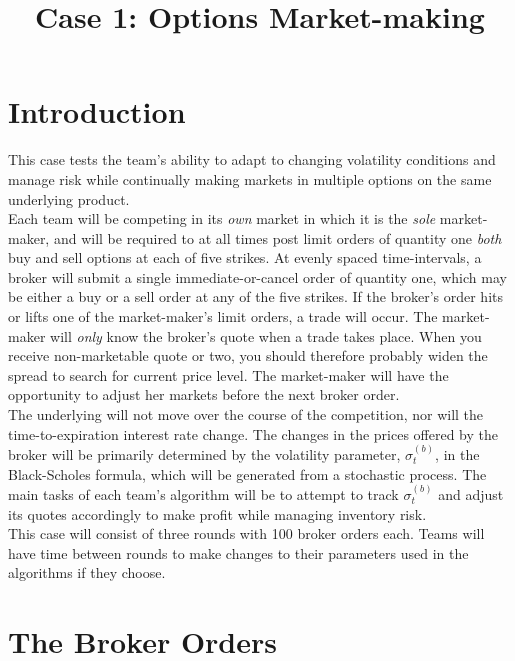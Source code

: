 \documentclass{amsart}
\renewcommand{\_}[1]{\underline{ #1 }}
\theoremstyle{definition}
\numberwithin{equation}{subsection}
\begin{document}
\title{Case 1: Options Market-making}
\maketitle

\section{Introduction}

\setlength{\parindent}{0.5cm}
This case tests the team's ability to adapt to changing volatility conditions and manage risk while continually making markets in multiple options on the same underlying product. 
\\

Each team will be competing in its {\it own} market in which it is the {\it sole} market-maker, and will be required to at all times post limit orders of quantity one {\it both} buy and sell options at each of five strikes. At evenly spaced time-intervals, a broker will submit a single immediate-or-cancel order of quantity one, which may be either a buy or a sell order at any of the five strikes. If the broker's order hits or lifts one of the market-maker's limit orders, a trade will occur. The market-maker will {\it only} know the broker's quote when a trade takes place. When you receive non-marketable quote or two, you should therefore probably widen the spread to search for current price level. The market-maker will have the opportunity to adjust her markets before the next broker order. 
\\

The underlying will not move over the course of the competition, nor will the time-to-expiration interest rate change. The changes in the prices offered by the broker will be primarily determined by the volatility parameter, $\sigma_t^{(b)}$, in the Black-Scholes formula, which will be generated from a stochastic process. The main tasks of each team's algorithm will be to attempt to track $\sigma_t^{(b)}$ and adjust its quotes accordingly to make profit while managing inventory risk. 
\\

This case will consist of three rounds with 100 broker orders each. Teams will have time between rounds to make changes to their parameters used in the algorithms if they choose. 


\section{The Broker Orders}
\end{document}
